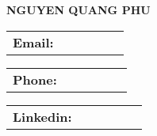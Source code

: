 \documentclass[letterpaper,11pt]{article}
\makeatletter
\newcommand{\resumeInfo}[2]{
  \vspace{-2pt}\item
  \begin{tabular}{p{3cm} p{4cm} p{4cm} p{4cm} p{4cm} p{4cm}}
      \textbf{\large#1} & \text{#2} \\
    \end{tabular}
}
\makeatother
\begin{document}

\begin{flushleft}
	\textbf{\Huge \scshape \textcolor{myblue}{NGUYEN QUANG PHU}} \\ \vspace{8pt}
  \resumeInfo{Email:}{nqphu1998@gmail.com}
  \resumeInfo{Phone:}{0559725898}
  \resumeInfo{Linkedin:}{linkedin.com/in/nqphu1998}
\end{flushleft}

%


\end{document}
